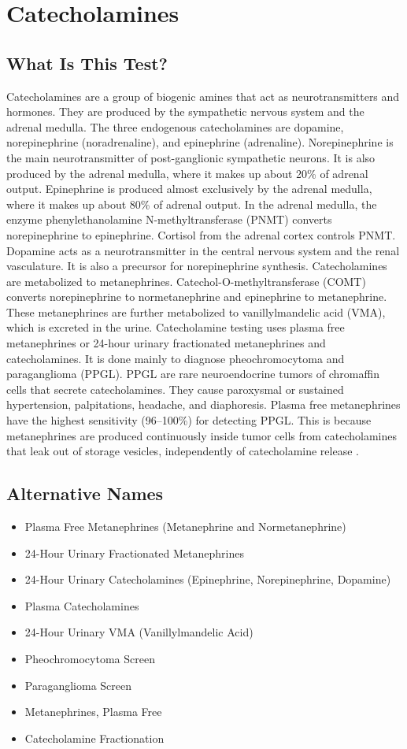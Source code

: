 \chapter{Catecholamines}

\section*{What Is This Test?}
Catecholamines are a group of biogenic amines that act as neurotransmitters and hormones. They are produced by the sympathetic nervous system and the adrenal medulla. The three endogenous catecholamines are dopamine, norepinephrine (noradrenaline), and epinephrine (adrenaline). Norepinephrine is the main neurotransmitter of post-ganglionic sympathetic neurons. It is also produced by the adrenal medulla, where it makes up about 20\% of adrenal output. Epinephrine is produced almost exclusively by the adrenal medulla, where it makes up about 80\% of adrenal output. In the adrenal medulla, the enzyme phenylethanolamine N-methyltransferase (PNMT) converts norepinephrine to epinephrine. Cortisol from the adrenal cortex controls PNMT. Dopamine acts as a neurotransmitter in the central nervous system and the renal vasculature. It is also a precursor for norepinephrine synthesis. Catecholamines are metabolized to metanephrines. Catechol-O-methyltransferase (COMT) converts norepinephrine to normetanephrine and epinephrine to metanephrine. These metanephrines are further metabolized to vanillylmandelic acid (VMA), which is excreted in the urine. Catecholamine testing uses plasma free metanephrines or 24-hour urinary fractionated metanephrines and catecholamines. It is done mainly to diagnose pheochromocytoma and paraganglioma (PPGL). PPGL are rare neuroendocrine tumors of chromaffin cells that secrete catecholamines. They cause paroxysmal or sustained hypertension, palpitations, headache, and diaphoresis. Plasma free metanephrines have the highest sensitivity (96--100\%) for detecting PPGL. This is because metanephrines are produced continuously inside tumor cells from catecholamines that leak out of storage vesicles, independently of catecholamine release \cite{lenders2002}.

\section*{Alternative Names}
\begin{itemize}
  \item Plasma Free Metanephrines (Metanephrine and Normetanephrine)
  \item 24-Hour Urinary Fractionated Metanephrines
  \item 24-Hour Urinary Catecholamines (Epinephrine, Norepinephrine, Dopamine)
  \item Plasma Catecholamines
  \item 24-Hour Urinary VMA (Vanillylmandelic Acid)
  \item Pheochromocytoma Screen
  \item Paraganglioma Screen
  \item Metanephrines, Plasma Free
  \item Catecholamine Fractionation
\end{itemize}
